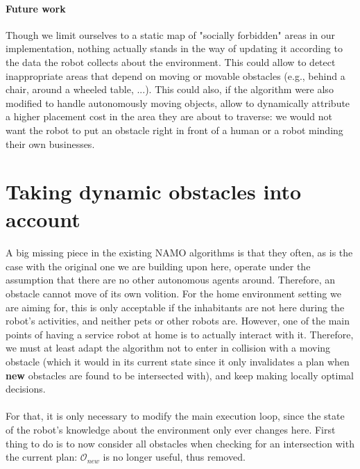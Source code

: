 
\paragraph{Future work} Though we limit ourselves to a static map of "socially forbidden" areas in our implementation, nothing actually stands in the way of updating it according to the data the robot collects about the environment. This could allow to detect inappropriate areas that depend on moving or movable obstacles (e.g., behind a chair, around a wheeled table, ...). This could also, if the algorithm were also modified to handle autonomously moving objects, allow to dynamically attribute a higher placement cost in the area they are about to traverse: we would not want the robot to put an obstacle right in front of a human or a robot minding their own businesses.

\section{Taking dynamic obstacles into account}\label{dynamic_section}

\paragraph{} A big missing piece in the existing NAMO algorithms is that they often, as is the case with the original one we are building upon here, operate under the assumption that there are no other autonomous agents around. Therefore, an obstacle cannot move of its own volition. For the home environment setting we are aiming for, this is only acceptable if the inhabitants are not here during the robot's activities, and neither pets or other robots are. However, one of the main points of having a service robot at home is to actually interact with it. Therefore, we must at least adapt the algorithm not to enter in collision with a moving obstacle (which it would in its current state since it only invalidates a plan when \textbf{new} obstacles are found to be intersected with), and keep making locally optimal decisions.

\paragraph{} For that, it is only necessary to modify the main execution loop, since the state of the robot's knowledge about the environment only ever changes here. First thing to do is to now consider all obstacles when checking for an intersection with the current plan: $\mathcal{O}_{new}$ is no longer useful, thus removed.

